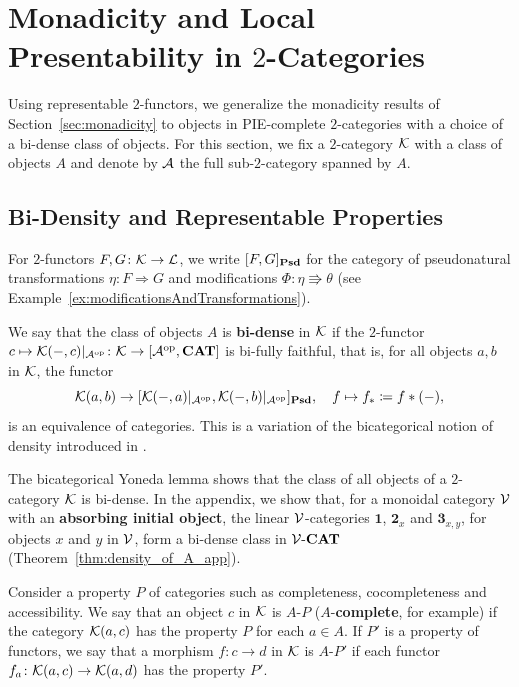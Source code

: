 

\section{Monadicity and Local Presentability in \texorpdfstring{$2$}{2}-Categories}\label{sec:representable}

Using representable $2$-functors, we generalize the monadicity results of Section~\ref{sec:monadicity} to objects in PIE-complete $2$-categories with a choice of a bi-dense class of objects. For this section, we fix a $2$-category $\mathcal{K}$ with a class of objects $A$ and denote by $\mathcal{A}$ the full sub-$2$-category spanned by $A$.

\subsection{Bi-Density and Representable Properties}

For $2$-functors $F,G\colon \mathcal{K}\to \mathcal{L}$, we write $[F,G]_{\mathbf{Psd}}$ for the category of pseudonatural transformations $\eta \colon F\Rightarrow G$ and modifications $\Phi\colon \eta\Rrightarrow\theta$ (see Example~\ref{ex:modificationsAndTransformations}).

\begin{definition}
We say that the class of objects $A$ is \textbf{bi-dense} in $\mathcal{K}$ if the $2$-functor $c\mapsto \mathcal{K}(-,c)|_{\mathcal{A}^{\mathrm{op}}}\colon \mathcal{K}\to [\mathcal{A}^{\mathrm{op}},\mathbf{CAT}]$ is bi-fully faithful, that is, for all objects $a,b$ in $\mathcal{K}$, the functor
\[
\mathcal{K}(a,b)\to [\mathcal{K}(-,a)|_{\mathcal{A}^{\mathrm{op}}},\mathcal{K}(-,b)|_{\mathcal{A}^{\mathrm{op}}}]_{\mathbf{Psd}},\quad f\mapsto f_*\coloneqq f*(-),
\]
is an equivalence of categories. This is a variation of the bicategorical notion of density introduced in \cite[Definition~6.2]{hofstraInnerAutoequivalencesGeneral2024}.
\end{definition}
The bicategorical Yoneda lemma \cite[(1.9)]{Street1980FibrationsBicategories} shows that the class of all objects of a $2$-category $\mathcal{K}$ is bi-dense. In the appendix, we show that, for a monoidal category $\mathcal{V}$ with an \textbf{absorbing initial object}, the linear $\mathcal{V}$-categories $\mathbf{1}$, $\mathbf{2}_x$ and $\mathbf{3}_{x,y}$, for objects $x$ and $y$ in $\mathcal{V}$, form a bi-dense class in $\mathcal{V}\text{-}\mathbf{CAT}$ (Theorem~\ref{thm:density_of_A_app}).

\begin{definition}[$A$ Properties]\label{def:representableProperties}
Consider a property $P$ of categories such as completeness, cocompleteness and accessibility. We say that an object $c$ in $\mathcal{K}$ is $A$-$P$ ($A$-\textbf{complete}, for example) if the category $\mathcal{K}(a,c)$ has the property $P$ for each $a\in A$. If $P'$ is a property of functors, we say that a morphism $f\colon c\to d$ in $\mathcal{K}$ is $A$-$P'$ if each functor $f_a\colon \mathcal{K}(a,c)\to \mathcal{K}(a,d)$ has the property $P'$.
\end{definition}

